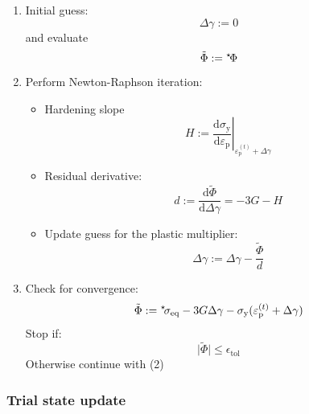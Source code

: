 \documentclass[namecite, fleqn]{goose-article}
\newcommand\leftstar[1]{\hspace*{-.3em}~^\star\!#1}
\begin{document}
\begin{enumerate}[(1)]

    \item Initial guess:
    \begin{equation}
        \Delta \gamma
        := 0
    \end{equation}
    and evaluate
    \begin{equation}
        \tilde{\Phi}
        := \leftstar{\Phi}
    \end{equation}

    \item Perform Newton-Raphson iteration:
    \begin{itemize}

    \item Hardening slope
    \begin{equation}
        H
        := \left.
        \frac{
            \mathrm{d} \sigma_\mathrm{y}
        }{
            \mathrm{d} \varepsilon_\mathrm{p}
        }
        \right|_{\varepsilon_\mathrm{p}^{(t)} + \Delta \gamma}
    \end{equation}

    \item Residual derivative:
    \begin{equation}
        d := \frac{\mathrm{d} \tilde{\Phi}}{\mathrm{d} \Delta \gamma}
        = -3G - H
    \end{equation}

    \item Update guess for the plastic multiplier:
    \begin{equation}
        \Delta \gamma := \Delta \gamma - \frac{\tilde{\Phi}}{d}
    \end{equation}
    \end{itemize}

    \item Check for convergence:
    \begin{equation}
        \tilde{\Phi}
        := \leftstar{\sigma}_\mathrm{eq}
        - 3 G \Delta \gamma
        - \sigma_\mathrm{y} ( \varepsilon_\mathrm{p}^{(t)} + \Delta \gamma )
    \end{equation}
    Stop if:
    \begin{equation}
        \big| \tilde{\Phi} \big| \leq \epsilon_\mathrm{tol}
    \end{equation}
    Otherwise continue with (2)

\end{enumerate}

\subsubsection{Trial state update}
\end{document}
